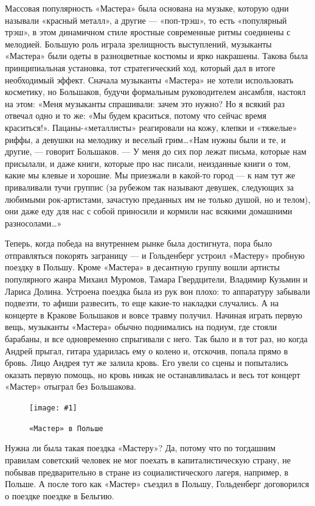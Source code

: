 \documentclass[16pt,a5paper]{book}
\newcommand{\myincludegraphics}[1]{\texttt{[image: \#1]}}
\begin{document}
Массовая популярность «Мастера» была основана на музыке, которую одни называли «красный металл», а другие — «поп-трэш»,
то есть «популярный трэш», в этом динамичном стиле яростные современные ритмы соединены с мелодией. Большую роль играла
зрелищность выступлений, музыканты «Мастера» были одеты в разноцветные костюмы и ярко накрашены. Такова была
принципиальная установка, тот стратегический ход, который дал в итоге необходимый эффект. Сначала музыканты «Мастера» не
хотели использовать косметику, но Большаков, будучи формальным руководителем ансамбля, настоял на этом: «Меня музыканты
спрашивали: зачем это нужно? Но я всякий раз отвечал одно и то же: «Мы будем краситься, потому что сейчас время
краситься!». Пацаны-«металлисты» реагировали на кожу, клепки и «тяжелые» риффы, а девушки на мелодику и веселый
грим\ldots «Нам нужны были и те, и другие, — говорит Большаков. — У меня до сих пор лежат письма, которые нам присылали,
и даже книги, которые про нас писали, неизданные книги о том, какие мы клевые и хорошие. Мы приезжали в какой-то город —
к нам тут же приваливали тучи группис (за рубежом так называют девушек, следующих за любимыми рок-артистами, зачастую
преданных им не только душой, но и телом), они даже еду для нас с собой приносили и кормили нас всякими домашними
разносолами\ldots»

Теперь, когда победа на внутреннем рынке была достигнута, пора было отправляться покорять заграницу — и Гольденберг
устроил «Мастеру» пробную поездку в Польшу. Кроме «Мастера» в десантную группу вошли артисты популярного жанра Михаил
Муромов, Тамара Гвердцители, Владимир Кузьмин и Лариса Долина. Устроена поездка была из рук вон плохо: то аппаратуру
забывали подвезти, то афиши развесить, то еще какие-то накладки случались. А на концерте в Кракове Большаков и вовсе
травму получил. Начиная играть первую вещь, музыканты «Мастера» обычно поднимались на подиум, где стояли барабаны, и все
одновременно спрыгивали с него. Так было и в тот раз, но когда Андрей прыгал, гитара ударилась ему о колено и, отскочив,
попала прямо в бровь. Лицо Андрея тут же залила кровь. Его увели со сцены и попытались оказать первую помощь, но кровь
никак не останавливалась и весь тот концерт «Мастер» отыграл без Большакова.

\begin{figure}[h]
    \centering
    \myincludegraphics{Image22}
    \caption{\texttt{«Мастер» в Польше}}
\end{figure}

Нужна ли была такая поездка «Мастеру»? Да, потому что по тогдашним правилам советский человек не мог поехать в
капиталистическую страну, не побывав предварительно в стране из социалистического лагеря, например, в Польше. А после
того как «Мастер» съездил в Польшу, Гольденберг договорился о поездке поездке в Бельгию.
\end{document}
